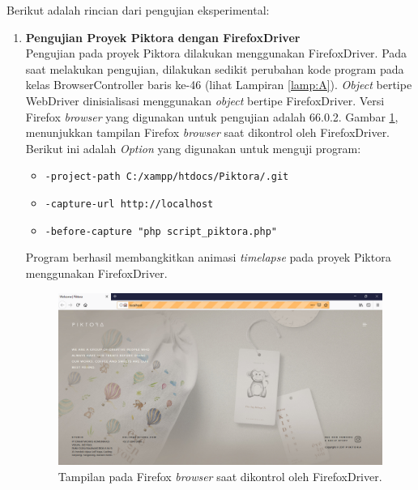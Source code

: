 Berikut adalah rincian dari pengujian eksperimental:

\begin{enumerate}
\item \textbf{Pengujian Proyek Piktora dengan FirefoxDriver}\\
Pengujian pada proyek Piktora dilakukan menggunakan FirefoxDriver. Pada saat melakukan pengujian, dilakukan sedikit perubahan kode program pada kelas BrowserController baris ke-46 (lihat Lampiran \ref{lamp:A}). \textit{Object} bertipe WebDriver dinisialisasi menggunakan \textit{object} bertipe FirefoxDriver. Versi Firefox \textit{browser} yang digunakan untuk pengujian adalah 66.0.2. Gambar \ref{fig:firefox}, menunjukkan tampilan Firefox \textit{browser} saat dikontrol oleh FirefoxDriver. Berikut ini adalah \textit{Option} yang digunakan untuk menguji program:
\begin{itemize}
\item \texttt{-project-path C:/xampp/htdocs/Piktora/.git}
\item \texttt{-capture-url http://localhost}
\item \texttt{-before-capture "php script\_piktora.php"}
\end{itemize}
Program berhasil membangkitkan animasi \textit{timelapse} pada proyek Piktora menggunakan FirefoxDriver.

\begin{figure}[H]
	\centering
		\includegraphics[scale=0.4]{Gambar/Firefox.png}
	\caption{Tampilan pada Firefox \textit{browser} saat dikontrol oleh FirefoxDriver.}
	\label{fig:firefox}
\end{figure}





\end{enumerate}
